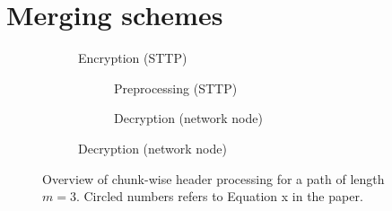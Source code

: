 \section*{Merging schemes}

\begin{figure}[H]
    \centering

    \begin{subfigure}[b]{0.48\linewidth}
        \resizebox{\linewidth}{!}{}
        \caption{Encryption (STTP)}
        \label{fig:chunk-encryption}
    \end{subfigure}
    \hfill
    \begin{subfigure}[b]{0.48\linewidth}

        \begin{subfigure}[t]{\linewidth}
            \centering
            \resizebox{\linewidth}{!}{}
            \caption{Preprocessing (STTP)}
            \label{fig:chunk-preprocessing}
        \end{subfigure}

        \vspace{0.5em}

        \begin{subfigure}[b]{\linewidth}
            \centering
            \resizebox{\linewidth}{!}{}
            \caption{Decryption (network node)}
            \label{fig:chunk-decryption}
        \end{subfigure}

    \end{subfigure}

    \caption{Overview of chunk-wise header processing for a path of length $m=3$. Circled numbers  refers to Equation x in the paper.}
    \label{fig:chunkwise-overview}
\end{figure}
